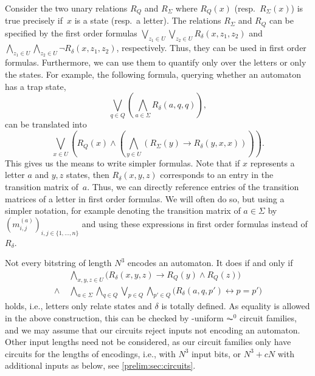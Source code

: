 Consider the two unary relations $R_Q$ and $R_{\Sigma}$
where $R_Q(x)$ (resp.~$R_{\Sigma}(x)$) 
is true precisely if~$x$ is a state (resp.~a letter).	
The relations $R_{\Sigma}$ and $R_Q$ can be specified by the first order
formulas $\bigvee_{z_1 \in U} \bigvee_{z_2 \in U} R_{\delta}(x, z_1, z_2)$
and 
$\bigwedge_{z_1 \in U} \bigwedge_{z_2 \in U} \neg R_{\delta}(x, z_1, z_2)$, respectively.
Thus, they can be used in first order formulas.
Furthermore, we can use them to quantify only over the letters
or only the states. For example, the following formula, querying
whether an automaton has a trap state,
\[
\bigvee_{q \in Q}  \left( \bigwedge_{a \in \Sigma} R_{\delta}(a, q, q) \right),
\]
can be translated into
\[
\bigvee_{x \in U} \left( R_{Q}(x) \land \left( \bigwedge_{y \in U} ( R_{\Sigma}(y) \rightarrow R_{\delta}(y,x,x) ) \right) \right).
\]
This gives us the means to write simpler formulas. 
Note that if $x$ represents a letter $a$ and $y,z$ states, then $R_{\delta}(x, y, z)$
corresponds to an entry in the transition matrix of~$a$. Thus, we can directly
reference entries of the transition matrices of a letter in first order formulas.
We will often do so, but using a simpler notation, for example
denoting the transition matrix of $a \in \Sigma$ by $(m^{(a)}_{i,j})_{i,j \in \{1,\ldots,n\}}$
and using these expressions in first order formulas
instead of $R_{\delta}$.

Not every bitstring of length $N^3$ encodes an automaton.
It does if and only if
\begin{align*}
	& \bigwedge_{x,y,z \in U} \bigl( R_{\delta}(x,y,z) \rightarrow R_Q(y) \land R_Q(z) \bigr) \\
	\land \; & \bigwedge_{a \in \Sigma} \bigwedge_{q \in Q} \bigvee_{p \in Q} \bigwedge_{p' \in Q}
	\bigl( R_{\delta}(a,q,p') \leftrightarrow p = p' \bigr)
\end{align*}
holds, i.e., letters only relate states and $\delta$ is totally defined.
As equality is allowed in the above construction,
this can be checked by \LOGSPACE-uniform $\AC^0$ circuit families,
and we may assume that our circuits reject inputs not encoding an automaton.
Other input lengths need not be considered,
as our circuit families only have circuits for the lengths of encodings,
i.e., with $N^3$ input bits, or $N^3 + cN$ with additional inputs as below,
see \cref{prelim:sec:circuits}.

